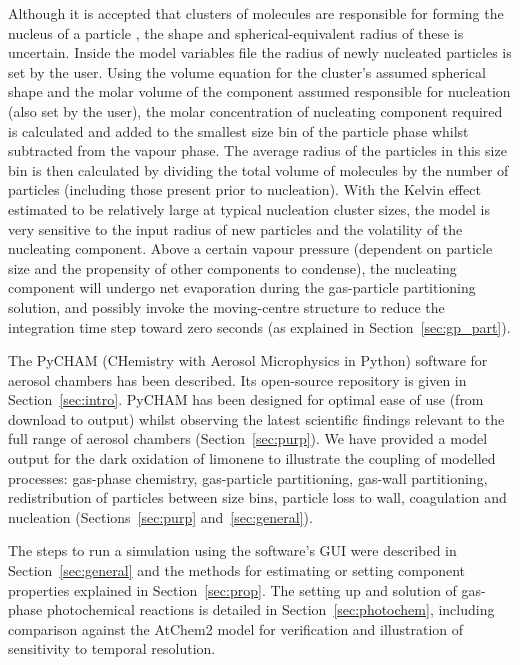 \documentclass[gmd, manuscript]{copernicus}
\begin{document}
Although it is accepted that clusters of molecules are responsible for forming the nucleus of a particle \citep{Seinfeld2006}, the shape and spherical-equivalent radius of these is uncertain.  Inside the model variables file the radius of newly nucleated particles is set by the user.  Using the volume equation for the cluster's assumed spherical shape and the molar volume of the component assumed responsible for nucleation (also set by the user), the molar concentration of nucleating component required is calculated and added to the smallest size bin of the particle phase whilst subtracted from the vapour phase.  The average radius of the particles in this size bin is then calculated by dividing the total volume of molecules by the number of particles (including those present prior to nucleation).  With the Kelvin effect estimated to be relatively large at typical nucleation cluster sizes, the model is very sensitive to the input radius of new particles and the volatility of the nucleating component.  Above a certain vapour pressure (dependent on particle size and the propensity of other components to condense), the nucleating component will undergo net evaporation during the gas-particle partitioning solution, and possibly invoke the moving-centre structure to reduce the integration time step toward zero seconds (as explained in Section~\ref{sec:gp_part}).


\conclusions
The PyCHAM (CHemistry with Aerosol Microphysics in Python) software for aerosol chambers has been described.  Its open-source repository is given in Section~\ref{sec:intro}.  PyCHAM has been designed for optimal ease of use (from download to output) whilst observing the latest scientific findings relevant to the full range of aerosol chambers (Section~\ref{sec:purp}).  We have provided a model output for the dark oxidation of limonene to illustrate the coupling of modelled processes: gas-phase chemistry, gas-particle partitioning, gas-wall partitioning, redistribution of particles between size bins, particle loss to wall, coagulation and nucleation (Sections~\ref{sec:purp} and~\ref{sec:general}).

The steps to run a simulation using the software's GUI were described in Section~\ref{sec:general} and the methods for estimating or setting component properties explained in Section~\ref{sec:prop}.  The setting up and solution of gas-phase photochemical reactions is detailed in Section~\ref{sec:photochem}, including comparison against the AtChem2 model \citep{sommariva_acm2018} for verification and illustration of sensitivity to temporal resolution.
\end{document}
